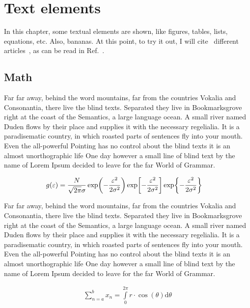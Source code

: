 \chapter{Text elements}
\label{cha:text-elements}

In this chapter, some textual elements are shown, like figures, tables,
lists, equations, etc. Also, bananas. At this point, to try it out, I will
cite~\cite{a} different articles~\cite{a,b,c}, as can be read in Ref.~\cite{b}.

\section{Math}
\label{sec:math}

Far far away, behind the word mountains, far from the countries Vokalia and
Consonantia, there live the blind texts. Separated they live in
Bookmarksgrove right at the coast of the Semantics, a large language
ocean. A small river named Duden flows by their place and supplies it with
the necessary regelialia. It is a paradisematic country, in which roasted
parts of sentences fly into your mouth. Even the all-powerful Pointing has
no control about the blind texts it is an almost unorthographic life One
day however a small line of blind text by the name of Lorem Ipsum decided
to leave for the far World of Grammar.

\begin{align}
    g(\varepsilon) &= \frac{N}{\sqrt{2\pi} \sigma}
    \exp\!\left(-\frac{\varepsilon^2}{2\sigma^2}\right)
    \exp\!\left[-\frac{\varepsilon^2}{2\sigma^2}\right]
    \exp\!\left\{-\frac{\varepsilon^2}{2\sigma^2}\right\} 
    \label{eq:gaussian}
\end{align}

Far far away, behind the word mountains, far from the countries Vokalia and
Consonantia, there live the blind texts. Separated they live in
Bookmarksgrove right at the coast of the Semantics, a large language
ocean. A small river named Duden flows by their place and supplies it with
the necessary regelialia. It is a paradisematic country, in which roasted
parts of sentences fly into your mouth. Even the all-powerful Pointing has
no control about the blind texts it is an almost unorthographic life One
day however a small line of blind text by the name of Lorem Ipsum decided
to leave for the far World of Grammar.

\begin{align}
  \sum\limits^b_{n=a}x_n = \int\limits^{2\pi}_0 r\cdot \cos(\theta) \mathrm d \theta
\end{align}


